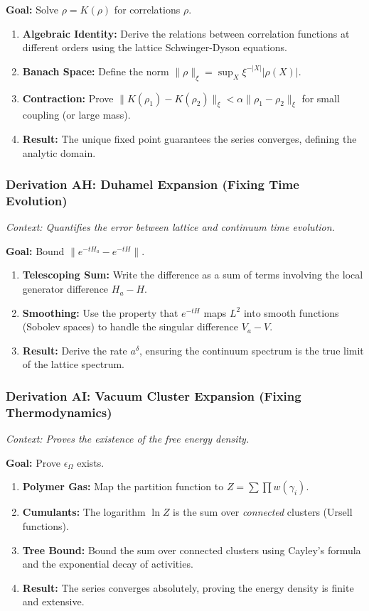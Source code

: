 \textbf{Goal:} Solve $\rho = K(\rho)$ for correlations $\rho$.

\begin{enumerate}
    \item \textbf{Algebraic Identity:} Derive the relations between correlation functions at different orders using the lattice Schwinger-Dyson equations.
    \item \textbf{Banach Space:} Define the norm $\|\rho\|_{\xi} = \sup_{X} \xi^{-|X|} |\rho(X)|$.
    \item \textbf{Contraction:} Prove $\|K(\rho_1) - K(\rho_2)\|_{\xi} < \alpha \|\rho_1 - \rho_2\|_{\xi}$ for small coupling (or large mass).
    \item \textbf{Result:} The unique fixed point guarantees the series converges, defining the analytic domain.
\end{enumerate}

\subsubsection{Derivation AH: Duhamel Expansion (Fixing Time Evolution)}

\textit{Context: Quantifies the error between lattice and continuum time evolution.}

\textbf{Goal:} Bound $\|e^{-tH_a} - e^{-tH}\|$.

\begin{enumerate}
    \item \textbf{Telescoping Sum:} Write the difference as a sum of terms involving the local generator difference $H_a - H$.
    \item \textbf{Smoothing:} Use the property that $e^{-tH}$ maps $L^2$ into smooth functions (Sobolev spaces) to handle the singular difference $V_a - V$.
    \item \textbf{Result:} Derive the rate $a^{\delta}$, ensuring the continuum spectrum is the true limit of the lattice spectrum.
\end{enumerate}

\subsubsection{Derivation AI: Vacuum Cluster Expansion (Fixing Thermodynamics)}

\textit{Context: Proves the existence of the free energy density.}

\textbf{Goal:} Prove $\epsilon_{\Omega}$ exists.

\begin{enumerate}
    \item \textbf{Polymer Gas:} Map the partition function to $Z = \sum \prod w(\gamma_i)$.
    \item \textbf{Cumulants:} The logarithm $\ln Z$ is the sum over \textit{connected} clusters (Ursell functions).
    \item \textbf{Tree Bound:} Bound the sum over connected clusters using Cayley's formula and the exponential decay of activities.
    \item \textbf{Result:} The series converges absolutely, proving the energy density is finite and extensive.
\end{enumerate}

